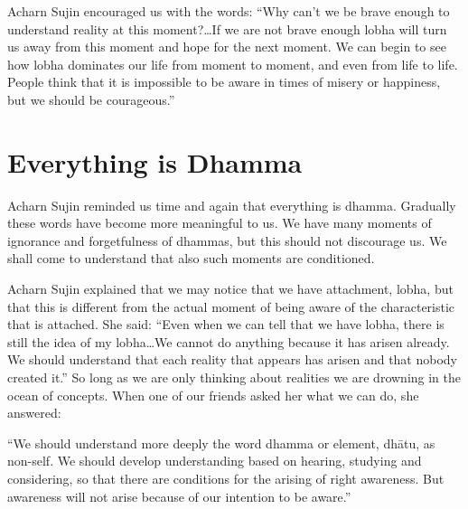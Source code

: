 Acharn Sujin encouraged us with the words: ``Why can't we be brave enough to understand reality at this moment?\ldots If we are not brave enough lobha will turn us away from this moment and hope for the next moment. We can begin to see how lobha dominates our life from moment to moment, and even from life to life. People think that it is impossible to be aware in times of misery or happiness, but we should be courageous.''


































\chapter{Everything is Dhamma}


Acharn Sujin reminded us time and again that everything is dhamma. Gradually these words have become more meaningful to us. We have many moments of ignorance and forgetfulness of dhammas, but this should not discourage us. We shall come to understand that also such moments are conditioned.

Acharn Sujin explained that we may notice that we have attachment, lobha, but that this is different from the actual moment of being aware of the characteristic that is attached. She said: ``Even when we can tell that we have lobha, there is still the idea of my lobha\ldots We cannot do anything because it has arisen already. We should understand that each reality that appears has arisen and that nobody created it.'' So long as we are only thinking about realities we are drowning in the ocean of concepts. When one of our friends asked her what we can do, she answered:

``We should understand more deeply the word dhamma or element, dhātu, as non-self. We should develop understanding based on hearing, studying and considering, so that there are conditions for the arising of right awareness. But awareness will not arise because of our intention to be aware.''

